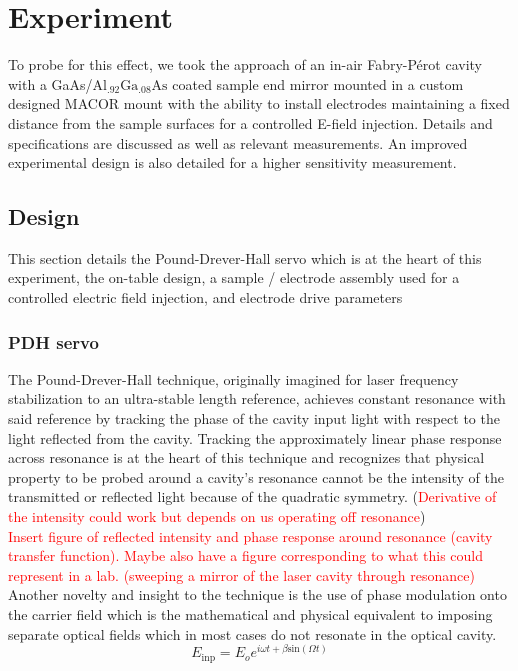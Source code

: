 \section{Experiment}
To probe for this effect, we took the approach of an in-air Fabry-P\'{e}rot cavity with a GaAs/$\mathrm{Al_{.92}Ga_{.08}As}$ coated sample end mirror mounted in a custom designed MACOR mount with the ability to install electrodes maintaining a fixed distance from the sample surfaces for a controlled E-field injection. Details and specifications are discussed as well as relevant measurements. An improved experimental design is also detailed for a higher sensitivity measurement.

\subsection{Design}
This section details the Pound-Drever-Hall servo which is at the heart of this experiment, the on-table design, a sample / electrode assembly used for a controlled electric field injection, and electrode drive parameters
\subsubsection{PDH servo}
The Pound-Drever-Hall technique, originally imagined for laser frequency stabilization to an ultra-stable length reference, achieves constant resonance with said reference by tracking the phase of the cavity input light with respect to the light reflected from the cavity. Tracking the approximately linear phase response across resonance is at the heart of this technique and recognizes that physical property to be probed around a cavity's resonance cannot be the intensity of the transmitted or reflected light because of the quadratic symmetry. (\textcolor{red}{Derivative of the intensity could work but depends on us operating off resonance})
\\
\textcolor{red}{Insert figure of reflected intensity and phase response around resonance (cavity transfer function). Maybe also have a figure corresponding to what this could represent in a lab. (sweeping a mirror of the laser cavity through resonance)}
\\
Another novelty and insight to the technique is the use of phase modulation onto the carrier field which is the mathematical and physical equivalent to imposing separate optical fields which in most cases do not resonate in the optical cavity.
\\
\begin{equation}
E_\mathrm{inp} = E_o e^{i \omega t + \beta \mathrm{sin}( \Omega t)}
\end{equation}

